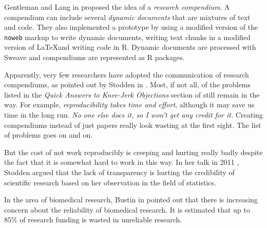 Gentleman and Lang in \cite{gentleman2007statistical} proposed the idea of a \emph{research compendium}. A compendium can include several \emph{dynamic documents} that are mixtures of text and code. They also implemented a prototype by using a modified version of the \texttt{noweb} markup \cite{ramsey1994literate} to write dynamic documents, writing text chunks in a modified version of \LaTeX and writing code in R. Dynamic documents are processed with Sweave \cite{leisch2002sweave} and compendiums are represented as R packages.

Apparently, very few researchers have adopted the communication of research compendiums, as pointed out by Stodden in \cite{stodden2014enabling}. Most, if not all, of the problems listed in the \emph{Quick Answers to Knee-Jerk Objections} section of \cite{donoho2009reproducible} still remain in the way. For example, \emph{reproducibility takes time and effort}, although it may save us time in the long run. \emph{No one else does it, so I won't get any credit for it.} Creating compendiums instead of just papers really look wasting at the first sight. The list of problems goes on and on.

But the cost of not work reproducibly is creeping and hurting really badly despite the fact that it is somewhat hard to work in this way. In her talk in 2011 \cite{stodden2011establishing}, Stodden argued that the lack of transparency is hurting the credibility of scientific research based on her observation in the field of statistics.

In the area of biomedical research, Bustin in \cite{bustin2015reproducibility} pointed out that there is increasing concern about the reliability of biomedical research. It is estimated that up to 85\% of research funding is wasted in unreliable research.


